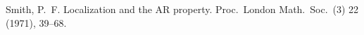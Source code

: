 \documentclass[12pt,twoside]{article}
\newcommand\arxivref[1]{\href{http://arxiv.org/abs/#1}{\tt arXiv:#1}}
\theoremstyle{plain} %
\theoremstyle{definition} %
\theoremstyle{definition} %
\numberwithin{theorem}{section}
\numberwithin{equation}{section}
\numberwithin{figure}{section}
\numberwithin{table}{section}
\begin{document}
\begin{thebibliography}{99}

%
%

Smith, P.~F.
Localization and the AR property.
Proc.\ London Math.\ Soc.\ (3) 22 (1971), 39--68.

%
%

\end{thebibliography}

\end{document}

